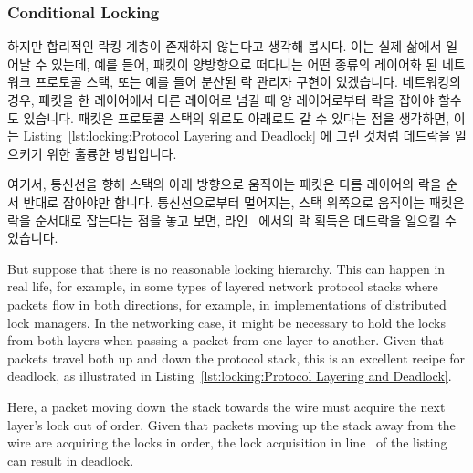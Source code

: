 \subsubsection{Conditional Locking}
\label{sec:locking:Conditional Locking}

하지만 합리적인 락킹 계층이 존재하지 않는다고 생각해 봅시다.
이는 실제 삶에서 일어날 수 있는데, 예를 들어, 패킷이 양방향으로 떠다니는 어떤
종류의 레이어화 된 네트워크 프로토콜 스택, 또는 예를 들어 분산된 락 관리자
구현이 있겠습니다.
네트워킹의 경우, 패킷을 한 레이어에서 다른 레이어로 넘길 때 양 레이어로부터
락을 잡아야 할수도 있습니다.
패킷은 프로토콜 스택의 위로도 아래로도 갈 수 있다는 점을 생각하면, 이는
Listing~\ref{lst:locking:Protocol Layering and Deadlock}
에 그린 것처럼 데드락을 일으키기 위한 훌륭한 방법입니다.
\begin{fcvref}
여기서, 통신선을 향해 스택의 아래 방향으로 움직이는 패킷은 다름 레이어의 락을
순서 반대로 잡아야만 합니다.
통신선으로부터 멀어지는, 스택 위쪽으로 움직이는 패킷은 락을 순서대로 잡는다는
점을 놓고 보면, 라인~ 에서의 락 획득은 데드락을 일으킬 수 있습니다.
\end{fcvref}

\iffalse

But suppose that there is no reasonable locking hierarchy.
This can happen in real life, for example, in some types of layered
network protocol stacks where packets flow in both directions, for
example, in implementations of distributed lock managers.
In the networking case, it might be necessary to hold the locks from
both layers when passing a packet from one layer to another.
Given that packets travel both up and down the protocol stack, this
is an excellent recipe for deadlock, as illustrated in
Listing~\ref{lst:locking:Protocol Layering and Deadlock}.
\begin{fcvref}
Here, a packet moving down the stack towards the wire must acquire
the next layer's lock out of order.
Given that packets moving up the stack away from the wire are acquiring
the locks in order, the lock acquisition in line~ of the listing
can result in deadlock.
\end{fcvref}

